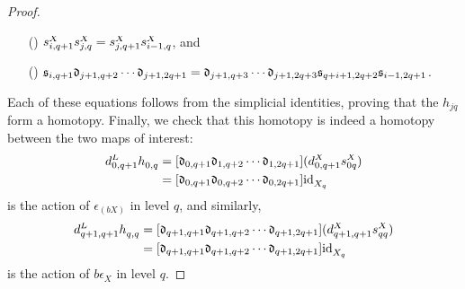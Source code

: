 \documentclass[11pt]{amsart}
\theoremstyle{plain}
\begin{document}
\begin{proof}
{\begin{enumerate}
\begin{enumerate}
\item[({\makebox[.51em][c]{a}})] ${s}_{\smash{i,q+1}}^{\smash{X}}\relax {s}_{\smash{j,q}}^{\smash{X}}={s}_{\smash{j,q+1}}^{\smash{X}}\relax {s}_{\smash{i-1,q}}^{\smash{X}}$,\textup{ and}%
\item[({\makebox[.51em][c]{b}})] 
$\mathfrak{s}_{i,q+1}\relax
\mathfrak{d}_{j+1,q+2}\relax\cdots \relax\mathfrak{d}_{j+1,2q+1}=
\mathfrak{d}_{j+1,q+3}\relax\cdots \relax\mathfrak{d}_{j+1,2q+3}\relax
\mathfrak{s}_{q+i+1,2q+2}\relax\mathfrak{s}_{i-1,2q+1}$.
\end{enumerate}
\end{enumerate}
\noindent Each of these equations follows from the simplicial identities, proving that the $h_{jq}$ form a homotopy. 
Finally, we check that this homotopy is indeed a homotopy between the two maps of interest:
\begin{alignat*}{2}
\trip{d}{0,q+1}{L}\trip{h}{0,q}{}
&=
[\frakd_{0,q+1}\frakd_{1,q+2}\circ\cdots \circ\frakd_{1,2q+1}](\trip{d}{0,q+1}{X}\trip{s}{0q}{X})%
\\
&=
[\frakd_{0,q+1}\frakd_{0,q+2}\circ\cdots \circ\frakd_{0,2q+1}]\trip{\textup{id}}{X_q}{}%
\end{alignat*}
is the action of  $\epsilon_{(bX)}$ in level $q$, and similarly,
\begin{alignat*}{2}
\trip{d}{q+1,q+1}{L}\trip{h}{q,q}{}
&=
[\frakd_{q+1,q+1}\frakd_{q+1,q+2}\circ\cdots \circ\frakd_{q+1,2q+1}](\trip{d}{q+1,q+1}{X}\trip{s}{qq}{X})
\\
&=
[\frakd_{q+1,q+1}\frakd_{q+1,q+2}\circ\cdots \circ\frakd_{q+1,2q+1}]\trip{\textup{id}}{X_q}{}%
\end{alignat*}
is the action of $b\epsilon_{X}$ in level $q$.
}%
\end{proof}



\printbibliography
\end{document}
